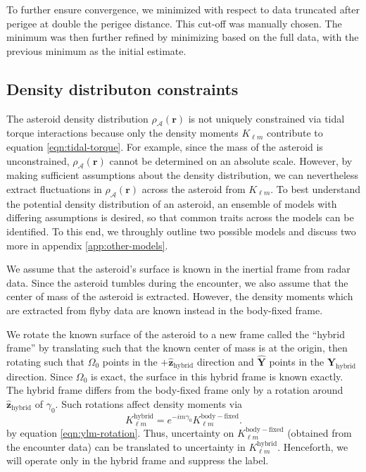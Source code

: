 \documentclass[fleqn,usenatbib]{mnras}
\newcommand{\unit}[1]{\bm{\hat{#1}}}
\begin{document}
To further ensure convergence, we minimized with respect to data truncated after perigee at double the perigee distance. This cut-off was manually chosen. The minimum was then further refined by minimizing based on the full data, with the previous minimum as the initial estimate.


\subsection{Density distributon constraints}
\label{sec:density-distro}

The asteroid density distribution $\rho_\mathcal{A}(\bm r)$ is not uniquely constrained via tidal torque interactions because only the density moments $K_{\ell m}$ contribute to equation \ref{eqn:tidal-torque}. For example, since the mass of the asteroid is unconstrained, $\rho_\mathcal{A}(\bm r)$ cannot be determined on an absolute scale. However, by making sufficient assumptions about the density distribution, we can nevertheless extract fluctuations in $\rho_\mathcal{A}(\bm r)$ across the asteroid from $K_{\ell m}$. To best understand the potential density distribution of an asteroid, an ensemble of models with differing assumptions is desired, so that common traits across the models can be identified. To this end, we throughly outline two possible models and discuss two more in appendix \ref{app:other-models}.

We assume that the asteroid's surface is known in the inertial frame from radar data. Since the asteroid tumbles during the encounter, we also assume that the center of mass of the asteroid is extracted.  However, the density moments which are extracted from flyby data are known instead in the body-fixed frame.

We rotate the known surface of the asteroid to a new frame called the ``hybrid frame'' by translating such that the known center of mass is at the origin, then rotating such that $\Omega_0$ points in the $+\unit z_\text{hybrid}$ direction and $\unit Y$ points in the $\unit Y_\text{hybrid}$ direction. Since $\Omega_0$ is exact, the surface in this hybrid frame is known exactly. The hybrid frame differs from the body-fixed frame only by a rotation around $\unit z_\text{hybrid}$ of $\gamma_0$. Such rotations affect density moments via 
\begin{equation}
  K_{\ell m}^\mathrm{hybrid} = e^{-im\gamma_0}K_{\ell m}^\mathrm{body-fixed}.
  \label{eqn:body-fixed-to-hybrid}
\end{equation}
by equation \ref{eqn:ylm-rotation}. Thus, uncertainty on $K_{\ell m}^\mathrm{body-fixed}$ (obtained from the encounter data) can be translated to uncertainty in $K_{\ell m}^\mathrm{hybrid}$. Henceforth, we will operate only in the hybrid frame and suppress the label.
\end{document}
